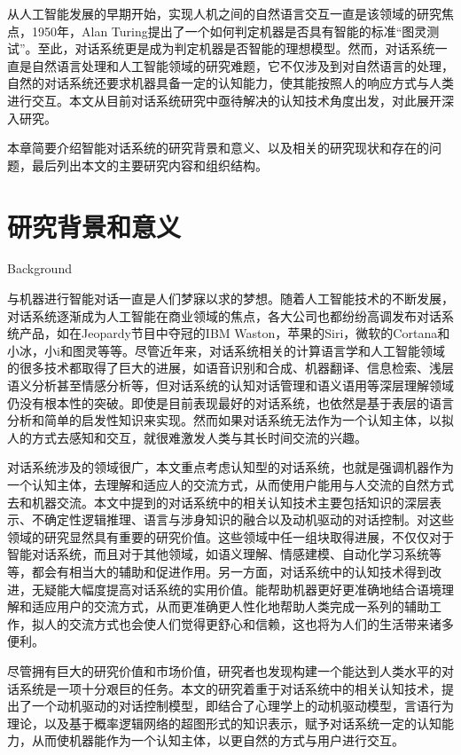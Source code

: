 

从人工智能发展的早期开始，实现人机之间的自然语言交互一直是该领域的研究焦点，1950年，Alan Turing提出了一个如何判定机器是否具有智能的标准“图灵测试”。至此，对话系统更是成为判定机器是否智能的理想模型。然而，对话系统一直是自然语言处理和人工智能领域的研究难题，它不仅涉及到对自然语言的处理，自然的对话系统还要求机器具备一定的认知能力，使其能按照人的响应方式与人类进行交互。本文从目前对话系统研究中亟待解决的认知技术角度出发，对此展开深入研究。

本章简要介绍智能对话系统的研究背景和意义、以及相关的研究现状和存在的问题，最后列出本文的主要研究内容和组织结构。

\section{研究背景和意义}{Background}

       与机器进行智能对话一直是人们梦寐以求的梦想。随着人工智能技术的不断发展，对话系统逐渐成为人工智能在商业领域的焦点，各大公司也都纷纷高调发布对话系统产品，如在Jeopardy节目中夺冠的IBM Waston，苹果的Siri，微软的Cortana和小冰，小i和图灵等等。尽管近年来，对话系统相关的计算语言学和人工智能领域的很多技术都取得了巨大的进展，如语音识别和合成、机器翻译、信息检索、浅层语义分析甚至情感分析等，但对话系统的认知对话管理和语义语用等深层理解领域仍没有根本性的突破。即使是目前表现最好的对话系统，也依然是基于表层的语言分析和简单的启发性知识来实现。然而如果对话系统无法作为一个认知主体，以拟人的方式去感知和交互，就很难激发人类与其长时间交流的兴趣。
   
       对话系统涉及的领域很广，本文重点考虑认知型的对话系统，也就是强调机器作为一个认知主体，去理解和适应人的交流方式，从而使用户能用与人交流的自然方式去和机器交流。本文中提到的对话系统中的相关认知技术主要包括知识的深层表示、不确定性逻辑推理、语言与涉身知识的融合以及动机驱动的对话控制。对这些领域的研究显然具有重要的研究价值。这些领域中任一组块取得进展，不仅仅对于智能对话系统，而且对于其他领域，如语义理解、情感建模、自动化学习系统等等，都会有相当大的辅助和促进作用。另一方面，对话系统中的认知技术得到改进，无疑能大幅度提高对话系统的实用价值。能帮助机器更好更准确地结合语境理解和适应用户的交流方式，从而更准确更人性化地帮助人类完成一系列的辅助工作，拟人的交流方式也会使人们觉得更舒心和信赖，这也将为人们的生活带来诸多便利。

         尽管拥有巨大的研究价值和市场价值，研究者也发现构建一个能达到人类水平的对话系统是一项十分艰巨的任务。本文的研究着重于对话系统中的相关认知技术，提出了一个动机驱动的对话控制模型，即结合了心理学上的动机驱动模型，言语行为理论，以及基于概率逻辑网络的超图形式的知识表示，赋予对话系统一定的认知能力，从而使机器能作为一个认知主体，以更自然的方式与用户进行交互。


